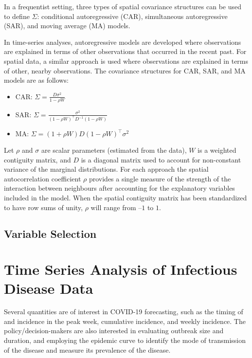 \documentclass[]{book}
\begin{document}
In a frequentist setting, three types of spatial covariance structures
can be used to define \(\Sigma\): conditional autoregressive (CAR),
simultaneous autoregressive (SAR), and moving average (MA) models.

In time-series analyses, autoregressive models are developed where
observations are explained in terms of other observations that occurred
in the recent past. For spatial data, a similar approach is used where
observations are explained in terms of other, nearby observations. The
covariance structures for CAR, SAR, and MA models are as follows:

\begin{itemize}
\item
  CAR: \(\Sigma=\frac{D\sigma^2}{1-\rho W}\)
\item
  SAR: \(\Sigma=\frac{\sigma^2}{(1-\rho W)^{\top}D^{-1}(1-\rho W)}\)
\item
  MA: \(\Sigma=(1+\rho W)D(1-\rho W)^{\top}\sigma^2\)
\end{itemize}

Let \(\rho\) and \(\sigma\) are scalar parameters (estimated from the
data), \(W\) is a weighted contiguity matrix, and \(D\) is a diagonal
matrix used to account for non-constant variance of the marginal
distributions. For each approach the spatial autocorrelation coefficient
\(\rho\) provides a single measure of the strength of the interaction
between neighbours after accounting for the explanatory variables
included in the model. When the spatial contiguity matrix has been
standardized to have row sums of unity, \(\rho\) will range from \(–1\)
to \(1\).

\section{Variable Selection}\label{variable-selection}

\chapter{Time Series Analysis of Infectious Disease
Data}\label{timeseries}

Several quantities are of interest in COVID-19 forecasting, such as the
timing of and incidence in the peak week, cumulative incidence, and
weekly incidence. The policy/decision-makers are also interested in
evaluating outbreak size and duration, and employing the epidemic curve
to identify the mode of transmission of the disease and measure its
prevalence of the disease.
\end{document}
